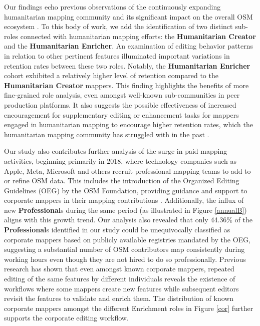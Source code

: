 \documentclass[manuscript,screen,review]{acmart}
\begin{document}
Our findings echo previous observations of the continuously expanding humanitarian mapping community and its significant impact on the overall OSM ecosystem \cite{herfort2021evolution,palen15}. 
To this body of work, we add the identification of two distinct sub-roles connected with humanitarian mapping efforts: the \textbf{Humanitarian Creator} and the \textbf{Humanitarian Enricher}. 
An examination of editing behavior patterns in relation to other pertinent features illuminated important variations in retention rates between these two roles. 
Notably, the \textbf{Humanitarian Enricher} cohort exhibited a relatively higher level of retention compared to the \textbf{Humanitarian Creator} mappers. 
This finding highlights the benefits of more fine-grained role analysis, even amongst well-known sub-communities in peer production platforms. 
It also suggests the possible effectiveness of increased encouragement for supplementary editing or enhancement tasks for mappers engaged in humanitarian mapping to encourage higher retention rates, which the humanitarian mapping community has struggled with in the past \cite{dittus16, Mahmud22}.

Our study also contributes further analysis of the surge in paid mapping activities, beginning primarily in 2018, where technology companies such as Apple, Meta, Microsoft and others recruit professional mapping teams to add to or refine OSM data. 
This includes the introduction of the Organized Editing Guidelines (OEG) by the OSM Foundation, providing guidance and support to corporate mappers in their mapping contributions \cite{Veselovsky22, Chapman13}.
Additionally, the influx of new \textbf{Professional}s during the same period (as illustrated in Figure \ref{annualB}) aligns with this growth trend. 
Our analysis also revealed that only 44.36\% of the \textbf{Professional}s identified in our study could be unequivocally classified as corporate mappers based on publicly available registries mandated by the OEG, suggesting a substantial number of OSM contributors map consistently during working hours even though they are not hired to do so professionally.
Previous research\cite{sarkar21} has shown that even amongst known corporate mappers, repeated editing of the same features by different individuals reveals the existence of workflows where some mappers create new features while subsequent editors revisit the features to validate and enrich them. 
The distribution of known corporate mappers amongst the different Enrichment roles in Figure \ref{cor} further supports the corporate editing workflow.
\end{document}

